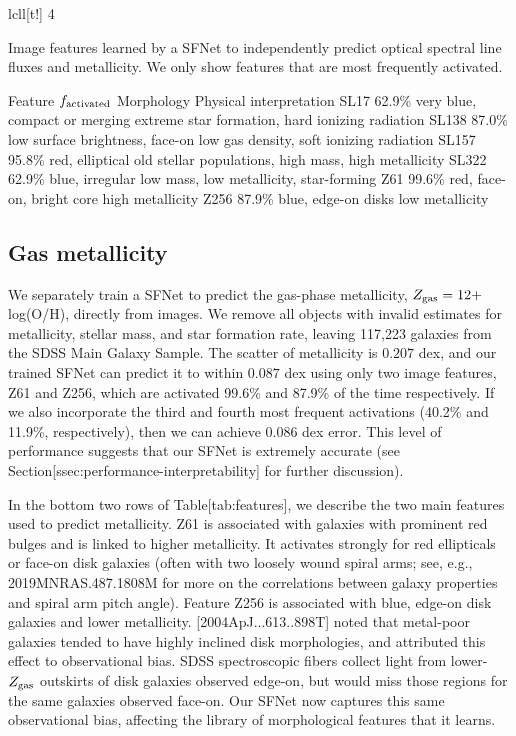 \documentclass[11pt,a4paper]{article}
\begin{document}
lcll[t!] 4

Image features learned by a SFNet to independently predict optical spectral line fluxes and metallicity. We only show features that are most frequently activated.

Feature  $f_{\rm activated}$  Morphology Physical interpretation SL17  62.9\%  very blue, compact or merging  extreme star formation, hard ionizing radiation SL138  87.0\%  low surface brightness, face-on  low gas density, soft ionizing radiation SL157  95.8\%  red, elliptical  old stellar populations, high mass, high metallicity SL322  62.9\%  blue, irregular  low mass, low metallicity, star-forming Z61  99.6\%  red, face-on, bright core  high metallicity Z256  87.9\%  blue, edge-on disks  low metallicity

\subsection{Gas metallicity}

We separately train a SFNet to predict the gas-phase metallicity,  $Z_{\rm gas} = 12 +$ log(O/H), directly from images. We remove all objects with invalid estimates for metallicity, stellar mass, and star formation rate, leaving 117,223 galaxies from the SDSS Main Galaxy Sample. The scatter of metallicity is  $0.207$ dex, and our trained SFNet can predict it to within  $0.087$ dex using only two image features, Z61 and Z256, which are activated 99.6\% and 87.9\% of the time respectively. If we also incorporate the third and fourth most frequent activations (40.2\% and 11.9\%, respectively), then we can achieve  $0.086$ dex error. This level of performance suggests that our SFNet is extremely accurate (see Section[ssec:performance-interpretability] for further discussion).

In the bottom two rows of Table[tab:features], we describe the two main features used to predict metallicity. Z61 is associated with galaxies with prominent red bulges and is linked to higher metallicity. It activates strongly for red ellipticals or face-on disk galaxies (often with two loosely wound spiral arms; see, e.g., 2019MNRAS.487.1808M for more on the correlations between galaxy properties and spiral arm pitch angle).  Feature Z256 is associated with blue, edge-on disk galaxies and lower metallicity. [2004ApJ...613..898T] noted that metal-poor galaxies tended to have highly inclined disk morphologies, and attributed this effect to observational bias. SDSS spectroscopic fibers collect light from lower- $Z_{\rm gas}$   outskirts of disk galaxies observed edge-on, but would miss those regions for the same galaxies observed face-on. Our SFNet now captures this same observational bias, affecting the library of morphological features that it learns.
\end{document}
